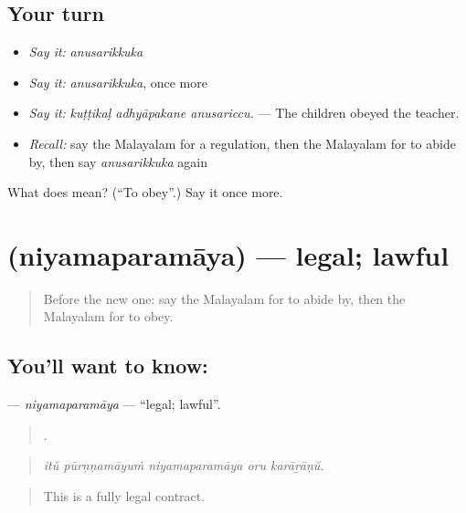 \subsection*{Your turn}
\begin{itemize}
\raggedright
  \item \emph{Say it:} \emph{anusarikkuka}
  \item \emph{Say it:} \emph{anusarikkuka}, once more
  \item \emph{Say it:} \emph{kuṭṭikaḷ adhyāpakane anusariccu.} — The children obeyed the teacher.
  \item \emph{Recall:} say the Malayalam for a regulation, then the Malayalam for to abide by, then say \emph{anusarikkuka} again
\end{itemize}

\begin{tcolorbox}[breakable,colback=teal!4,colframe=teal!35!black,title={Before you move on}]
What does  mean? (\textquotedblleft{}To obey\textquotedblright{}.) Say it once more.
\end{tcolorbox}
\section[\texorpdfstring{\ml{നിയമപരമായ} (niyamaparamāya)}{നിയമപരമായ (niyamaparamāya)}]{ (niyamaparamāya) — legal; lawful}

\label{lesson:ML-C417-niyamaparamaya}



\begin{quote}
Before the new one: say the Malayalam for to abide by, then the Malayalam for to obey.
\end{quote}

\subsection*{You'll want to know: }
\textbf{} — \emph{niyamaparamāya} — \textquotedblleft{}legal; lawful\textquotedblright{}.

\begin{quote}
    .
\end{quote}

\begin{quote}
\emph{itŭ pūrṇṇamāyuṁ niyamaparamāya oru karāṟāṇŭ.}
\end{quote}

\begin{quote}
This is a fully legal contract.
\end{quote}

